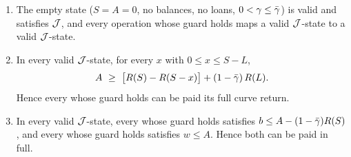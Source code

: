 \begin{theorem}[Safety]\label{thm:safety}
\begin{enumerate}[label=(\alph*)]
\item The empty state ($S=A=0$, no balances, no loans, $0<\gamma\le\bar\gamma$) is valid and satisfies $\mathcal{J}$, and every operation whose guard holds maps a valid $\mathcal{J}$-state to a valid $\mathcal{J}$-state.
\item In every valid $\mathcal{J}$-state, for every $x$ with $0\le x\le S-L$,
\begin{equation}\label{eq:coverage}
A\ \ge\ \bigl[R(S)-R(S-x)\bigr]+(1-\bar\gamma)\,R(L).
\end{equation}
Hence every  whose guard holds can be paid its full curve return.
\item In every valid $\mathcal{J}$-state, every  whose guard holds satisfies $b\le A-(1-\bar\gamma)R(S)$, and every  whose guard holds satisfies $w\le A$. Hence both can be paid in full.
\end{enumerate}
\end{theorem}
